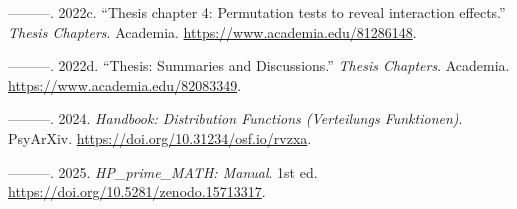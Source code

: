 \documentclass[
]{article}
\newlength{\cslhangindent}
\newlength{\cslentryspacingunit} %
\newenvironment{CSLReferences}[2] %
 {%
  \setlength{\parindent}{0pt}
  \ifodd #1
  \let\oldpar\par
  \def\par{\hangindent=\cslhangindent\oldpar}
  \fi
  \setlength{\parskip}{#2\cslentryspacingunit}
 }%
 {}
\begin{document}
\begin{CSLReferences}{1}{0}
\leavevmode{}%
---------. 2022c. {``{Thesis chapter 4: Permutation tests to reveal
interaction effects}.''} \emph{Thesis Chapters}. Academia.
\url{https://www.academia.edu/81286148}.

\leavevmode{}%
---------. 2022d. {``{Thesis: Summaries and Discussions}.''}
\emph{Thesis Chapters}. Academia.
\url{https://www.academia.edu/82083349}.

\leavevmode{}%
---------. 2024. \emph{Handbook: Distribution Functions (Verteilungs
Funktionen)}. PsyArXiv. \url{https://doi.org/10.31234/osf.io/rvzxa}.

\leavevmode{}%
---------. 2025. \emph{HP\_prime\_MATH: Manual}. 1st ed.
\url{https://doi.org/10.5281/zenodo.15713317}.

\end{CSLReferences}
\end{document}
